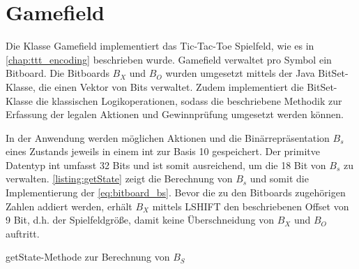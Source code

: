 \section{Gamefield}
Die Klasse Gamefield implementiert das Tic-Tac-Toe Spielfeld, wie es in \cref{chap:ttt_encoding} beschrieben wurde. 
Gamefield verwaltet pro Symbol ein Bitboard. 
Die Bitboards $B_X$ und $B_O$ wurden umgesetzt mittels der Java BitSet-Klasse, die einen Vektor von Bits verwaltet. 
Zudem implementiert die BitSet-Klasse die klassischen Logikoperationen, sodass die beschriebene Methodik zur Erfassung der legalen Aktionen und Gewinnprüfung umgesetzt werden können. 

In der Anwendung werden möglichen Aktionen und die Binärrepräsentation $B_{s}$ eines Zustands jeweils in einem int zur Basis 10 gespeichert.
Der primitve Datentyp int umfasst 32 Bits und ist somit ausreichend, um die 18 Bit von $B_{s}$ zu verwalten.  \cref{listing:getState} zeigt die Berechnung von $B_{s}$ und somit die Implementierung der \cref{eq:bitboard_bs}. 
Bevor die zu den Bitboards zugehörigen Zahlen addiert werden, erhält $B_X$ mittels LSHIFT den beschriebenen Offset von 9 Bit, d.h. der Spielfeldgröße, damit keine Überschneidung von $B_X$ und $B_O$ auftritt.

\begin{listing}[h]
\caption{getState-Methode zur Berechnung von $B_S$}
\label{listing:getState}
\inputminted{java}{04_Artefakte/03_Listings/getState.java}
\end{listing}